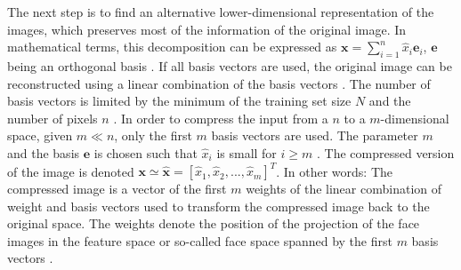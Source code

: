 The next step is to find an alternative lower-dimensional representation of the images, which preserves most of the information of the original image.
In mathematical terms, this decomposition can be expressed as 
$\textbf{x} = \sum_{i=1}^{n}\hat{x}_{i} \textbf{e}_{i}$, 
$\textbf{e}$ being an orthogonal basis 
\cite{eigenfaces1997}.
If all basis vectors are used, the original image can be reconstructed using a linear combination of the basis vectors \cite{eigenfaces1991, face-recognition2020}.
The number of basis vectors is limited by the minimum of the training set size $N$ \cite{eigenfaces1991} and the number of pixels $n$ \cite{face-recognition2020}.
In order to compress the input from a $n$ to a $m$-dimensional space, given $m \ll n$, only the first $m$ basis vectors are used.
The parameter $m$ and the basis $\textbf{e}$ is chosen such that $\hat{x}_{i}$ is small for $i \ge m$ \cite{eigenfaces1997}.
The compressed version of the image is denoted $\textbf{x} \simeq \hat{\textbf{x}} = \left[\hat{x}_{1}, \hat{x}_{2}, ..., \hat{x}_{m}  \right]^{T}$.
In other words: 
The compressed image is a vector of the first $m$ weights of the linear combination of weight and basis vectors used to transform the compressed image back to the original space.
The weights denote the position of the projection of the face images in the feature space or so-called face space spanned by the first $m$ basis vectors \cite{eigenfaces1991}.

